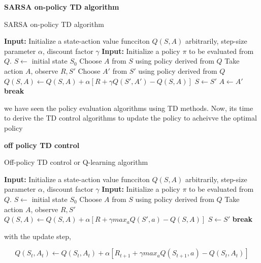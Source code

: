 \documentclass[../main.tex]{subfiles}
\begin{document}
\textbf{SARSA on-policy TD  algorithm}

\begin{algorithm}[H]
\caption{SARSA on-policy TD algorithm}
\begin{algorithmic}[1]
\State \textbf{Input:} Initialize a state-action value funcciton $Q(S, A)$ arbitrarily, step-size parameter $\alpha$, discount factor $\gamma$
\State \textbf{Input:} Initialize a policy $\pi$ to be evaluated from $Q$.
\State  $S \leftarrow$ initial state $S_0$
\State Choose $A$ from $S$ using policy derived from $Q$
\State  Take action $A$, observe $R, S'$
\State  Choose $A'$ from $S'$ using policy derived from $Q$
\State  $Q(S, A) \leftarrow Q(S, A) + \alpha \left[ R + \gamma Q(S', A') - Q(S, A) \right]$
\State  $S \leftarrow S'$
\State  $A \leftarrow A'$
\State \textbf{break}
\EndIf
\EndFor
\EndWhile
\end{algorithmic}
\end{algorithm}

we have seen the policy evaluation algorithms using TD methods. Now, its time to derive the TD control algorithms to update the policy to acheivve the optimal policy

\textbf{off policy TD control}

\begin{algorithm}[H]
\caption{Off-policy TD control or Q-learning algorithm}
\begin{algorithmic}[1]
    \State \textbf{Input:} Initialize a state-action value funcciton $Q(S, A)$ arbitrarily, step-size parameter $\alpha$, discount factor $\gamma$
\State \textbf{Input:} Initialize a policy $\pi$ to be evaluated from $Q$.
\State  $S \leftarrow$ initial state $S_0$
\State Choose $A$ from $S$ using policy derived from $Q$ 
\State  Take action $A$, observe $R, S'$
\State  $Q(S, A) \leftarrow Q(S, A) + \alpha \left[ R + \gamma max_a Q(S', a) - Q(S, A) \right]$
\State  $S \leftarrow S'$
\State \textbf{break}
\EndIf
\EndFor
\EndWhile
\end{algorithmic}
\end{algorithm}

with the update step,

\begin{equation}
Q(S_t, A_t) \leftarrow Q(S_t, A_t) + \alpha \left[ R_{t+1} + \gamma max_a Q(S_{t+1}, a) - Q(S_t, A_t) \right] \nonumber
\end{equation}
\end{document}
